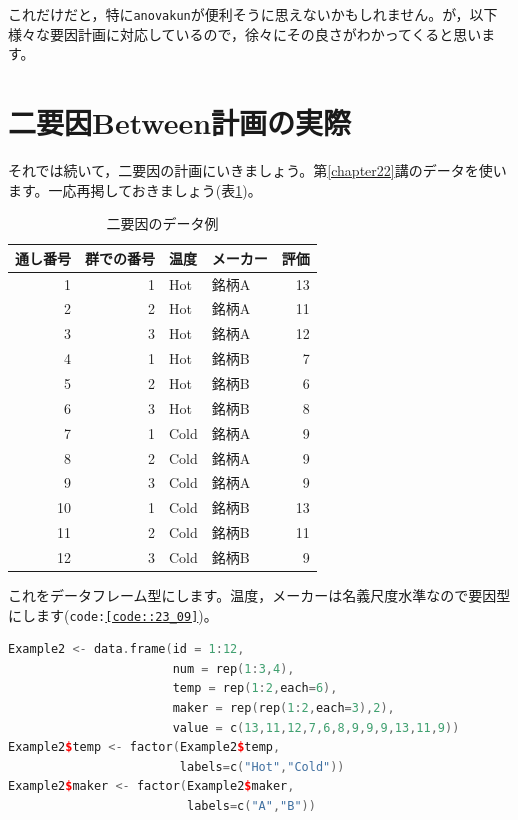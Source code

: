 \documentclass{ltjsarticle}
\begin{document}
これだけだと，特に\texttt{anovakun}が便利そうに思えないかもしれません。が，以下様々な要因計画に対応しているので，徐々にその良さがわかってくると思います。
\section{二要因Between計画の実際}
それでは続いて，二要因の計画にいきましょう。第\ref{chapter22}講のデータを使います。一応再掲しておきましょう(表\ref{tbl::23_02})。
\begin{table}[ht]
  \centering
  \caption{二要因のデータ例} 
  \begin{tabular}{rrllr}
    \hline
  通し番号 & 群での番号 & 温度 & メーカー & 評価 \\ 
    \hline
  1 & 1 & Hot & 銘柄A & 13 \\ 
    2 & 2 & Hot & 銘柄A & 11 \\ 
    3 & 3 & Hot & 銘柄A & 12 \\ 
    4 & 1 & Hot & 銘柄B & 7 \\ 
    5 & 2 & Hot & 銘柄B & 6 \\ 
    6 & 3 & Hot & 銘柄B & 8 \\ 
    7 & 1 & Cold & 銘柄A & 9 \\ 
    8 & 2 & Cold & 銘柄A & 9 \\ 
    9 & 3 & Cold & 銘柄A & 9 \\ 
    10 & 1 & Cold & 銘柄B & 13 \\ 
    11 & 2 & Cold & 銘柄B & 11 \\ 
    12 & 3 & Cold & 銘柄B & 9 \\ 
     \hline
  \end{tabular}

  \label{tbl::23_02}
  \end{table}
これをデータフレーム型にします。温度，メーカーは名義尺度水準なので要因型にします(\texttt{code:\ref{code::23_09}})。
\begin{lstlisting}[language=c++,label={code::23_09},caption={データフレームにする}]
Example2 <- data.frame(id = 1:12,
                       num = rep(1:3,4),
                       temp = rep(1:2,each=6),
                       maker = rep(rep(1:2,each=3),2),
                       value = c(13,11,12,7,6,8,9,9,9,13,11,9))
Example2$temp <- factor(Example2$temp,
                        labels=c("Hot","Cold"))
Example2$maker <- factor(Example2$maker,
                         labels=c("A","B"))
\end{lstlisting}
\end{document}
